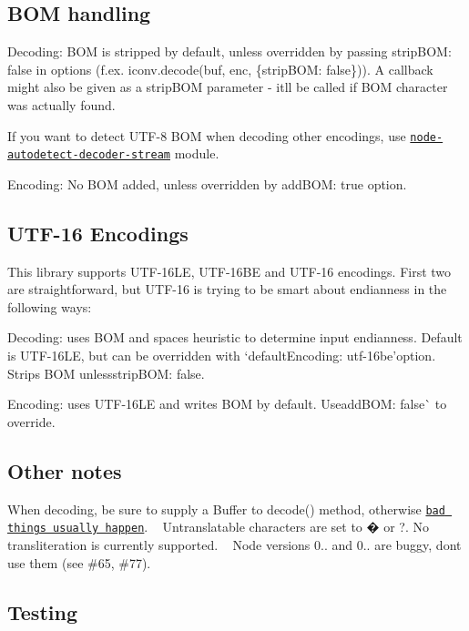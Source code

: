 \subsection*{B\+OM handling}


\begin{DoxyItemize}
\item Decoding\+: B\+OM is stripped by default, unless overridden by passing {\ttfamily strip\+B\+OM\+: false} in options (f.\+ex. {\ttfamily iconv.\+decode(buf, enc, \{strip\+B\+OM\+: false\})}). A callback might also be given as a {\ttfamily strip\+B\+OM} parameter -\/ it\textquotesingle{}ll be called if B\+OM character was actually found.
\item If you want to detect U\+T\+F-\/8 B\+OM when decoding other encodings, use \href{https://github.com/danielgindi/node-autodetect-decoder-stream}{\tt node-\/autodetect-\/decoder-\/stream} module.
\item Encoding\+: No B\+OM added, unless overridden by {\ttfamily add\+B\+OM\+: true} option.
\end{DoxyItemize}

\subsection*{U\+T\+F-\/16 Encodings}

This library supports U\+T\+F-\/16\+LE, U\+T\+F-\/16\+BE and U\+T\+F-\/16 encodings. First two are straightforward, but U\+T\+F-\/16 is trying to be smart about endianness in the following ways\+:
\begin{DoxyItemize}
\item Decoding\+: uses B\+OM and \textquotesingle{}spaces heuristic\textquotesingle{} to determine input endianness. Default is U\+T\+F-\/16\+LE, but can be overridden with `default\+Encoding\+: \textquotesingle{}utf-\/16be'{\ttfamily option. Strips B\+OM unless}strip\+B\+OM\+: false{\ttfamily .}
\item {\ttfamily Encoding\+: uses U\+T\+F-\/16\+LE and writes B\+OM by default. Use}add\+B\+OM\+: false\`{} to override.
\end{DoxyItemize}

\subsection*{Other notes}

When decoding, be sure to supply a Buffer to decode() method, otherwise \href{https://github.com/ashtuchkin/iconv-lite/wiki/Use-Buffers-when-decoding}{\tt bad things usually happen}. ~\newline
Untranslatable characters are set to � or ?. No transliteration is currently supported. ~\newline
Node versions 0.. and 0.. are buggy, don\textquotesingle{}t use them (see \#65, \#77). ~\newline
 \subsection*{Testing}


 